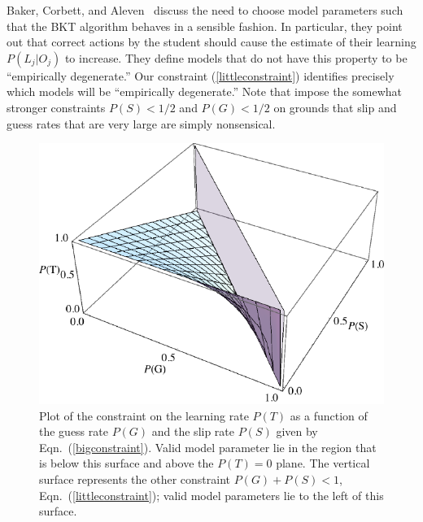 \documentclass{acmlarge-edm}
\begin{document}
Baker, Corbett, and Aleven~\citeyear{baker_more_2008} discuss the need
to choose model parameters such that the BKT algorithm behaves in a sensible
fashion.  In particular, they point out that correct actions by
the student should cause the estimate of their learning
$P(L_j|O_j)$ to increase.  They define models that do not have
this property to be ``empirically degenerate.''   Our constraint
(\ref{littleconstraint}) identifies precisely which models will be ``empirically
degenerate.''  Note that \cite{baker_more_2008} impose the somewhat
stronger constraints $P(S)<1/2$ and $P(G)<1/2$ on grounds that slip and
guess rates that are very large are simply nonsensical.


\begin{figure}
\centering\includegraphics{region.pdf}
\caption{
  Plot of the constraint on the learning rate $P(T)$
  as a function of the  guess rate $P(G)$ and the
  slip rate $P(S)$ given by  Eqn.~(\ref{bigconstraint}).  Valid model parameter lie in the region 
  that is below this surface and above the $P(T)=0$ plane.  The
  vertical surface represents the other constraint $ P(G)+P(S)< 1 $,
  Eqn.~(\ref{littleconstraint}); valid model parameters lie to the left of this surface.
}
 \label{region}
\end{figure}
\end{document}
